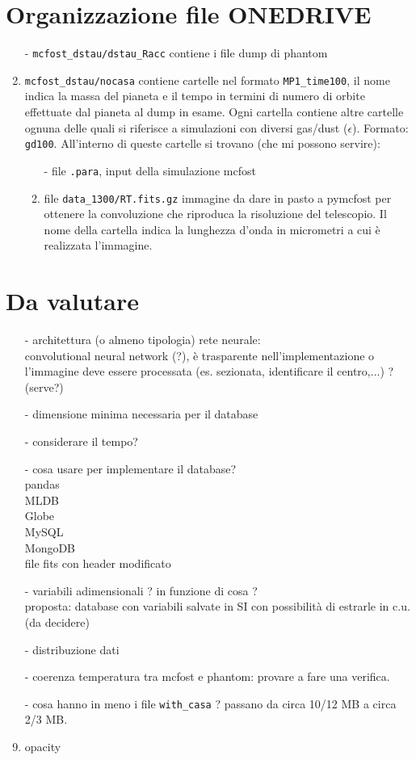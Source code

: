 \documentclass[DIN, pagenumber=false, fontsize=11pt, parskip=half]{scrartcl}
\begin{document}
\section{Organizzazione file ONEDRIVE}

\begin{enumerate}
 \item[-] \lstinline{mcfost_dstau/dstau_Racc} contiene i file dump di phantom
 \item[-] \lstinline{mcfost_dstau/nocasa} contiene cartelle nel formato \lstinline{MP1_time100}, il nome indica la massa del pianeta e il tempo in termini di numero di orbite effettuate dal pianeta al dump in esame. Ogni cartella contiene
 altre cartelle ognuna delle quali si riferisce a simulazioni con diversi gas/dust ($\epsilon$). Formato: \lstinline{gd100}. All'interno di queste cartelle si trovano (che mi possono servire):
 \begin{enumerate}
 \item[-] file \lstinline{.para}, input della simulazione mcfost 
 \item[-] file \lstinline{data_1300/RT.fits.gz} immagine da dare in pasto a pymcfost per ottenere la convoluzione che riproduca la risoluzione del telescopio. Il nome della cartella indica la lunghezza d'onda in micrometri a cui è realizzata l'immagine.
\end{enumerate}
\end{enumerate}


\section{Da valutare}
\begin{enumerate}
 \item[-] architettura (o almeno tipologia) rete neurale: \\ convolutional neural network (?), è trasparente nell'implementazione o l'immagine deve essere processata (es. sezionata, identificare il centro,...) ? (serve?)
 \item[-] dimensione minima necessaria per il database
 \item[-] considerare il tempo?
 \item[-] cosa usare per implementare il database? \\ pandas \\ MLDB \\ Globe \\ MySQL \\ MongoDB \\ file fits con header modificato
 \item[-] variabili adimensionali ? in funzione di cosa ? \\ proposta: database con variabili salvate in SI con possibilità di estrarle in c.u. (da decidere)
 \item[-] distribuzione dati
 \item[-] coerenza temperatura tra mcfost e phantom: provare a fare una verifica. \item[-] cosa hanno in meno i file \lstinline{with_casa} ? passano da circa 10/12 MB a circa 2/3 MB.
 \item[-] opacity
\end{enumerate}
\end{document}
